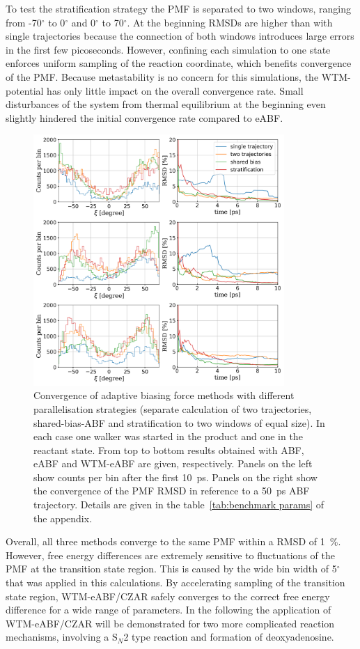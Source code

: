 To test the stratification strategy the PMF is separated to two windows, ranging from -70$^\circ$ to 0$^\circ$ and 0$^\circ$ to 70$^\circ$.
At the beginning RMSDs are higher than with single trajectories because the connection of both windows introduces large errors in the first few picoseconds.
However, confining each simulation to one state enforces uniform sampling of the reaction coordinate, which benefits convergence of the PMF.
Because metastability is no concern for this simulations, the WTM-potential has only little impact on the overall convergence rate.
Small disturbances of the system from thermal equilibrium at the beginning even slightly hindered the initial convergence rate compared to eABF.
\begin{figure}[H]
  \centering
    \includegraphics[width=0.85\textwidth]{bilder/benchmark/ABF_acc_benchmark}
   \caption{
   Convergence of adaptive biasing force methods with different parallelisation strategies (separate calculation of two trajectories, shared-bias-ABF and stratification to two windows of equal size). In each case one walker was started in the product and one in the reactant state. From top to bottom results obtained with ABF, eABF and WTM-eABF are given, respectively. Panels on the left show counts per bin after the first 10~ps. Panels on the right show the convergence of the PMF RMSD in reference to a 50~ps ABF trajectory. Details are given in the table~\ref{tab:benchmark params} of the appendix.}
   \label{fig:conf ABF}
\end{figure}
Overall, all three methods converge to the same PMF within a RMSD of 1~\%.
However, free energy differences are extremely sensitive to fluctuations of the PMF at the transition state region.
This is caused by the wide bin width of 5$^\circ$ that was applied in this calculations.
By accelerating sampling of the transition state region, WTM-eABF/CZAR safely converges to the correct free energy difference for a wide range of parameters.
In the following the application of WTM-eABF/CZAR will be demonstrated for two more complicated reaction mechanisms, involving a S$_N$2 type reaction and formation of deoxyadenosine.
\newpage

